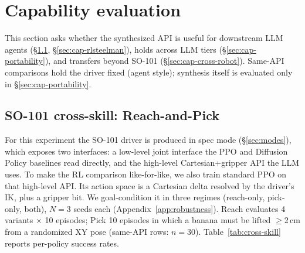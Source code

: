 \section{Capability evaluation}
\label{sec:capability}

This section asks whether the synthesized API is useful for
downstream LLM agents (\S\ref{sec:cap-cross},
\S\ref{sec:cap-rlsteelman}), holds across LLM tiers
(\S\ref{sec:cap-portability}), and transfers beyond SO-101
(\S\ref{sec:cap-cross-robot}). Same-API comparisons hold the driver
fixed (agent style); synthesis itself is evaluated only in
\S\ref{sec:cap-portability}.

\subsection{SO-101 cross-skill: Reach-and-Pick}
\label{sec:cap-cross}

For this experiment the SO-101 driver is produced in spec mode
(\S\ref{sec:modes}), which exposes two interfaces: a low-level
joint interface the PPO and Diffusion Policy baselines read directly,
and the high-level Cartesian+gripper API the LLM uses. To make the RL comparison
like-for-like, we also train standard PPO on that high-level API. Its
action space is a Cartesian delta resolved by the driver's IK, plus a
gripper bit. We goal-condition it in three regimes (reach-only,
pick-only, both), $N{=}3$ seeds each (Appendix~\ref{app:robustness}). Reach evaluates 4 variants $\times$
10 episodes; Pick 10 episodes in which a banana must be lifted
$\geq$2\,cm from a randomized XY pose (same-API rows: $n{=}30$).
Table~\ref{tab:cross-skill} reports per-policy success rates.

